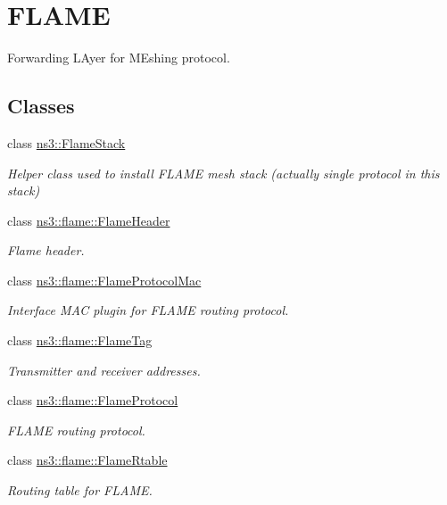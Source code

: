 \hypertarget{group__flame}{}\section{F\+L\+A\+ME}
\label{group__flame}


Forwarding L\+Ayer for M\+Eshing protocol.  


\subsection*{Classes}
\begin{DoxyCompactItemize}
\item 
class \hyperlink{classns3_1_1FlameStack}{ns3\+::\+Flame\+Stack}
\begin{DoxyCompactList}\small\item\em Helper class used to install F\+L\+A\+ME mesh stack (actually single protocol in this stack) \end{DoxyCompactList}\item 
class \hyperlink{classns3_1_1flame_1_1FlameHeader}{ns3\+::flame\+::\+Flame\+Header}
\begin{DoxyCompactList}\small\item\em Flame header. \end{DoxyCompactList}\item 
class \hyperlink{classns3_1_1flame_1_1FlameProtocolMac}{ns3\+::flame\+::\+Flame\+Protocol\+Mac}
\begin{DoxyCompactList}\small\item\em Interface M\+AC plugin for F\+L\+A\+ME routing protocol. \end{DoxyCompactList}\item 
class \hyperlink{classns3_1_1flame_1_1FlameTag}{ns3\+::flame\+::\+Flame\+Tag}
\begin{DoxyCompactList}\small\item\em Transmitter and receiver addresses. \end{DoxyCompactList}\item 
class \hyperlink{classns3_1_1flame_1_1FlameProtocol}{ns3\+::flame\+::\+Flame\+Protocol}
\begin{DoxyCompactList}\small\item\em F\+L\+A\+ME routing protocol. \end{DoxyCompactList}\item 
class \hyperlink{classns3_1_1flame_1_1FlameRtable}{ns3\+::flame\+::\+Flame\+Rtable}
\begin{DoxyCompactList}\small\item\em Routing table for F\+L\+A\+ME. \end{DoxyCompactList}\end{DoxyCompactItemize}


